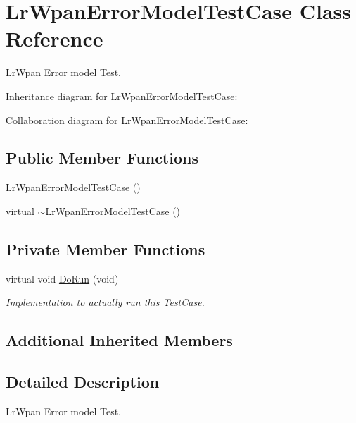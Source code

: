 \hypertarget{classLrWpanErrorModelTestCase}{}\section{Lr\+Wpan\+Error\+Model\+Test\+Case Class Reference}
\label{classLrWpanErrorModelTestCase}


Lr\+Wpan Error model Test.  




Inheritance diagram for Lr\+Wpan\+Error\+Model\+Test\+Case\+:


Collaboration diagram for Lr\+Wpan\+Error\+Model\+Test\+Case\+:
\subsection*{Public Member Functions}
\begin{DoxyCompactItemize}
\item 
\hyperlink{classLrWpanErrorModelTestCase_a98d32d32f3e2df710dc99b3492a0e173}{Lr\+Wpan\+Error\+Model\+Test\+Case} ()
\item 
virtual \hyperlink{classLrWpanErrorModelTestCase_a2ac568ceddae1ace7c6a688f58992588}{$\sim$\+Lr\+Wpan\+Error\+Model\+Test\+Case} ()
\end{DoxyCompactItemize}
\subsection*{Private Member Functions}
\begin{DoxyCompactItemize}
\item 
virtual void \hyperlink{classLrWpanErrorModelTestCase_adfe4168af63db274fca72cf42a9d5a44}{Do\+Run} (void)
\begin{DoxyCompactList}\small\item\em Implementation to actually run this Test\+Case. \end{DoxyCompactList}\end{DoxyCompactItemize}
\subsection*{Additional Inherited Members}


\subsection{Detailed Description}
Lr\+Wpan Error model Test. 

